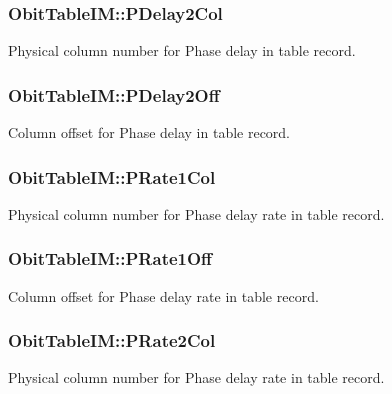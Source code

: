 \subsubsection{ {\bf Obit\-Table\-IM::PDelay2Col}}\label{structObitTableIM_o56}


Physical column number for Phase delay in table record. 

\subsubsection{ {\bf Obit\-Table\-IM::PDelay2Off}}\label{structObitTableIM_o55}


Column offset for Phase delay in table record. 

\subsubsection{ {\bf Obit\-Table\-IM::PRate1Col}}\label{structObitTableIM_o48}


Physical column number for Phase delay rate in table record. 

\subsubsection{ {\bf Obit\-Table\-IM::PRate1Off}}\label{structObitTableIM_o47}


Column offset for Phase delay rate in table record. 

\subsubsection{ {\bf Obit\-Table\-IM::PRate2Col}}\label{structObitTableIM_o60}


Physical column number for Phase delay rate in table record. 

